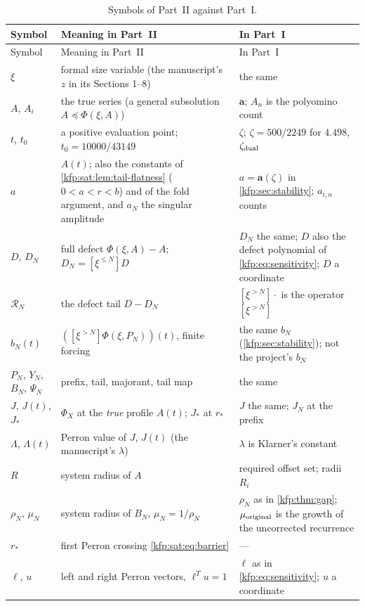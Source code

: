 \documentclass[11pt,a4paper]{article}
\theoremstyle{definition}
\theoremstyle{remark}
\newcommand{\bA}{\boldsymbol a}
\newcommand{\tail}[2]{[\xi^{>#1}]#2}
\newcommand{\strunc}[1]{[\xi^{\le #1}]}
\newcommand{\shigh}[1]{[\xi^{>#1}]}
\newcommand{\satR}{\mathcal R}
\begin{document}
\begin{longtable}{@{}>{\raggedright\arraybackslash}p{}>{\raggedright\arraybackslash}p{}>{\raggedright\arraybackslash}p{}@{}}
\caption{Symbols of Part~II against Part~I.}\label{kfp:sat:tab:notation}\\
\toprule
Symbol & Meaning in Part~II & In Part~I\\
\midrule
\endfirsthead
\toprule
Symbol & Meaning in Part~II & In Part~I\\
\midrule
\endhead
$\xi$ & formal size variable (the manuscript's $z$ in its Sections 1--8) & the same\\
$A$, $A_i$ & the true series (a general subsolution $A\preceq\Phi(\xi,A)$) & $\bA$; $A_n$ is the polyomino count\\
$t$, $t_0$ & a positive evaluation point; $t_0=10000/43149$ & $\zeta$; $\zeta=500/2249$ for $4.498$, $\zeta_{\rm dual}$\\
$a$ & $A(t)$; also the constants of \cref{kfp:sat:lem:tail-flatness} ($0<a<r<b$) and of the fold argument, and $a_N$ the singular amplitude & $a=\bA(\zeta)$ in \cref{kfp:sec:stability}; $a_{i,n}$ counts\\
$D$, $D_N$ & full defect $\Phi(\xi,A)-A$; $D_N=\strunc N D$ & $D_N$ the same; $D$ also the defect polynomial of \eqref{kfp:eq:sensitivity}; $D$ a coordinate\\
$\satR_N$ & the defect tail $D-D_N$ & $\tail{N}{\cdot}$ is the operator $[\xi^{>N}]$\\
$b_N(t)$ & $(\shigh N\Phi(\xi,P_N))(t)$, finite forcing & the same $b_N$ (\cref{kfp:sec:stability}); not the project's $b_N$\\
$P_N$, $Y_N$, $B_N$, $\Psi_N$ & prefix, tail, majorant, tail map & the same\\
$J$, $J(t)$, $J_*$ & $\Phi_X$ at the \emph{true} profile $A(t)$; $J_*$ at $r_*$ & $J$ the same; $J_N$ at the prefix\\
$\Lambda$, $\Lambda(t)$ & Perron value of $J$, $J(t)$ (the manuscript's $\lambda$) & $\lambda$ is Klarner's constant\\
$R$ & system radius of $A$ & required offset set; radii $R_i$\\
$\rho_N$, $\mu_N$ & system radius of $B_N$, $\mu_N=1/\rho_N$ & $\rho_N$ as in \cref{kfp:thm:gap}; $\mu_{\rm original}$ is the growth of the uncorrected recurrence\\
$r_*$ & first Perron crossing \eqref{kfp:sat:eq:barrier} & ---\\
$\ell$, $u$ & left and right Perron vectors, $\ell^Tu=1$ & $\ell$ as in \eqref{kfp:eq:sensitivity}; $u$ a coordinate\\

\end{longtable}
\end{document}
